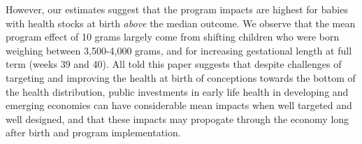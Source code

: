 \documentclass[12pt]{article}
\begin{document}
\begin{spacing}{1.4}
However, our estimates suggest that the program impacts are highest for
babies with health stocks at birth \emph{above} the median outcome.  We
observe that the mean program effect of 10 grams largely come from
shifting children who were born weighing between 3,500-4,000 grams, and
for increasing gestational length at full term (weeks 39 and 40). 
All told this paper suggests that despite challenges of targeting and
improving the health at birth of conceptions towards the bottom of the
health distribution, public investments in early life health in developing
and emerging economies can have considerable mean impacts when well targeted
and well designed, and that these impacts may propogate through the economy
long after birth and program implementation.  %



%



\newpage

\newpage


\clearpage
\setcounter{table}{0}
\renewcommand{\thetable}{A\arabic{table}}
\setcounter{figure}{0}
\renewcommand{\thefigure}{A\arabic{figure}}
\renewcommand{\thepage}{A\arabic{page}}
\appendix

\end{spacing}
\end{document}

